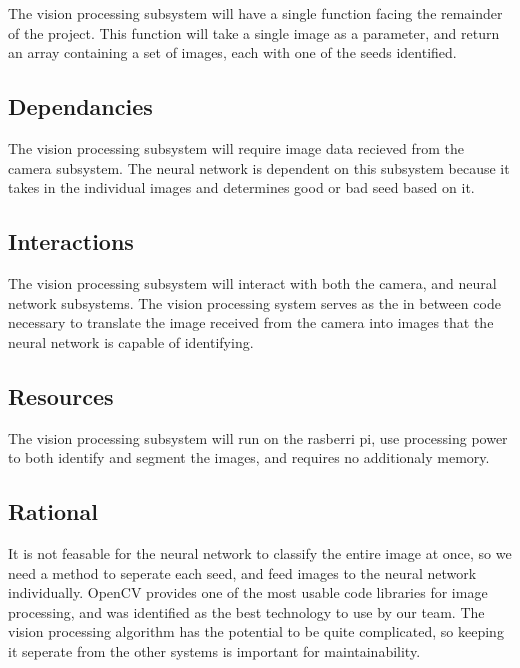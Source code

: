 The vision processing subsystem will have a single function facing the remainder of the project. 
This function will take a single image as a parameter, and return an array containing a set of images, each with one of the seeds identified. 

\subsection{Dependancies} 

The vision processing subsystem will require image data recieved from the camera subsystem. The neural network is dependent on this subsystem because it takes in the individual images and determines good or bad seed based on it.

\subsection{Interactions}

The vision processing subsystem will interact with both the camera, and neural network subsystems. 
The vision processing system serves as the in between code necessary to translate the image received from the camera
into images that the neural network is capable of identifying.

\subsection{Resources} 

The vision processing subsystem will run on the rasberri pi, use processing power to both identify and segment the images, and requires no additionaly memory. 

\subsection{Rational}

It is not feasable for the neural network to classify the entire image at once, so we need a method to seperate each seed, and feed images to the neural network individually. 
OpenCV provides one of the most usable code libraries for image processing, and was identified as the best technology to use by our team.
The vision processing algorithm has the potential to be quite complicated, so keeping it seperate from the other systems is important for maintainability.
 



